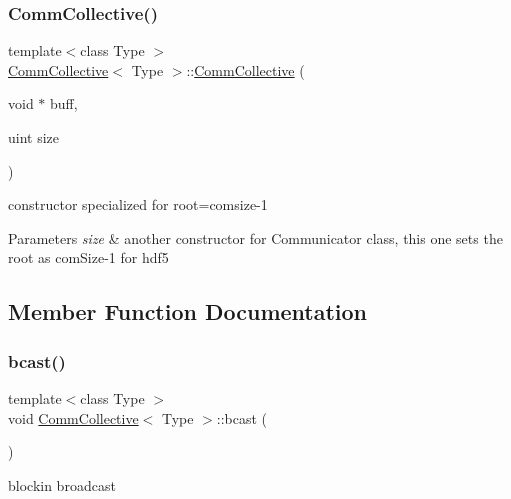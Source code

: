 \subsubsection{\texorpdfstring{Comm\+Collective()}{CommCollective()}\hspace{0.1cm}{\footnotesize\ttfamily [2/2]}}
{\footnotesize\ttfamily template$<$class Type $>$ \\
\mbox{\hyperlink{classCommCollective}{Comm\+Collective}}$<$ Type $>$\+::\mbox{\hyperlink{classCommCollective}{Comm\+Collective}} (\begin{DoxyParamCaption}\item[{void $\ast$}]{buff,  }\item[{uint}]{size }\end{DoxyParamCaption})}

constructor specialized for root=comsize-\/1 
\begin{DoxyParams}{Parameters}
{\em size} & another constructor for Communicator class, this one sets the root as com\+Size-\/1 for hdf5 \\
\hline
\end{DoxyParams}


\subsection{Member Function Documentation}
\mbox{\label{classCommCollective_a438805e16ba8c74b0682a0bf27b4b0f3}} 
\subsubsection{\texorpdfstring{bcast()}{bcast()}}
{\footnotesize\ttfamily template$<$class Type $>$ \\
void \mbox{\hyperlink{classCommCollective}{Comm\+Collective}}$<$ Type $>$\+::bcast (\begin{DoxyParamCaption}{ }\end{DoxyParamCaption})}

blockin broadcast \mbox{\label{classCommCollective_a2a300899ded8e81afa840f06497716f9}} 
